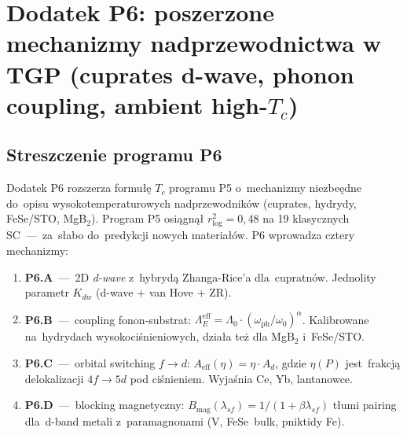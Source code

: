
\section*{Dodatek P6: poszerzone mechanizmy nadprzewodnictwa
w TGP (cuprates d-wave, phonon coupling, ambient high-$T_c$)}%
%
\label{app:P6}

\subsection*{Streszczenie programu P6}

Dodatek P6 rozszerza formu\l{}\k{e} $T_c$ programu P5 o~mechanizmy
niezbe\k{e}dne do~opisu wysokotemperaturowych nadprzewodnik\'ow (cuprates,
hydrydy, FeSe/STO, MgB${}_2$). Program P5 osi\k{a}gn\k{a}\l{} $r^2_{\log}=0{,}48$
na 19 klasycznych SC~---~za~s\l{}abo do~predykcji nowych materia\l{}\'ow.
P6 wprowadza cztery mechanizmy:

\begin{enumerate}\itemsep0pt
  \item \textbf{P6.A}~---~2D \emph{d-wave} z~hybryd\k{a} Zhanga-Rice'a
  dla~cupratn\'ow. Jednolity parametr $K_{dw}$ (d-wave + van Hove + ZR).
  \item \textbf{P6.B}~---~coupling fonon-substrat: $\Lambda_E^{\text{eff}}
  = \Lambda_0 \cdot (\omega_\text{ph}/\omega_0)^\alpha$. Kalibrowane
  na~hydrydach wysokoci\'snieniowych, dzia\l{}a te\.z dla MgB${}_2$
  i~FeSe/STO.
  \item \textbf{P6.C}~---~orbital switching $f\!\to\!d$: $A_\text{eff}(\eta)=
  \eta \cdot A_d$, gdzie $\eta(P)$ jest~frakcj\k{a} delokalizacji
  $4f\!\to\!5d$ pod ci\'snieniem. Wyja\'snia Ce, Yb, lantanowce.
  \item \textbf{P6.D}~---~blocking magnetyczny: $B_\text{mag}(\lambda_{sf})
  = 1/(1+\beta\lambda_{sf})$ t\l{}umi pairing dla~d-band metali
  z~paramagnonami (V, FeSe~bulk, pniktidy Fe).
\end{enumerate}


